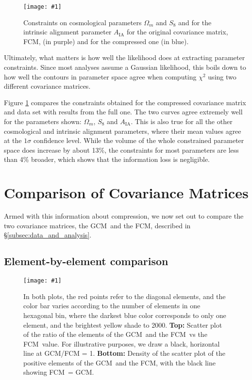 \documentclass[aps, prd, twocolumn, superscriptaddress, nofootinbib, amssymb, amsmath]{revtex4-2}
\newcommand{\sfig}[2]{
	\texttt{[image: \#1]}
}
\newcommand{\Sfig}[3]{
	\begin{figure}[#1]
		\sfig{../figures/#2.pdf}{\columnwidth}
		\caption{#3}
		\label{fig:#2}
	\end{figure}
}
\newcommand{\rf}[1]{Figure \ref{fig:#1}}
\newcommand{\rssec}[1]{\S\ref{subsec:#1}}
\newcommand\full{the FCM}
\newcommand\gaussian{the GCM}
\begin{document}
\Sfig{b}{Comp2pt-constraints_wmS8A}{Constraints on cosmological parameters $\Omega_m$ and $S_8$ and for the intrinsic alignment parameter $A_{\text{IA}}$ for the original covariance matrix, FCM, (in purple) and for the compressed one (in blue).}

Ultimately, what matters is how well the likelihood does at extracting parameter constraints. Since most analyses assume a Gaussian likelihood, this boils down to how well the contours in parameter space agree when computing $\chi^2$ using two different covariance matrices.	

\rf{Comp2pt-constraints_wmS8A} compares the constraints obtained for the compressed covariance matrix and data set with results from the full one. The two curves agree extremely well for the parameters shown: $\Omega_m$, $S_8$ and $A_{\text{IA}}$. This is also true for all the other cosmological and intrinsic alignment parameters, where their mean values agree at the $1 \sigma$ confidence level. While the volume of the whole constrained parameter space does increase by about 13\%, the constraints for most parameters are less than 4\% broader, which shows that the information loss is negligible.

\section{Comparison of Covariance Matrices}
\label{sec:comparison_matrices}

Armed with this information about compression, we now set out to compare the two covariance matrices, \gaussian\ and \full, described in \rssec{data_and_analysis}.

\subsection{Element-by-element comparison}
\label{subsec:compare_one-one}

\Sfig{thbp}{Y1-scatter}{In both plots, the red points refer to the diagonal elements, and the color bar varies according to the number of elements in one hexagonal bin, where the darkest blue color corresponds to only one element, and the brightest yellow shade to 2000. \textbf{Top:} Scatter plot of the ratio of the elements of \gaussian\ and \full\ vs \full\ value. For illustrative purposes, we draw a black, horizontal line at GCM/FCM = 1. \textbf{Bottom:} Density of the scatter plot of the positive elements of \gaussian\ and \full, with the black line showing FCM\ = GCM.}
\end{document}

